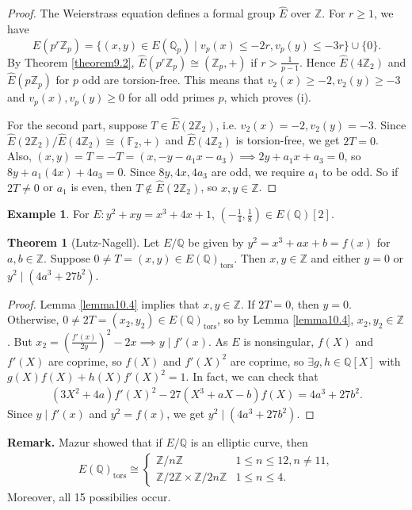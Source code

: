 \documentclass{article}
\theoremstyle{definition}
\newtheorem{theorem}{Theorem}[section]
\newtheorem{example}{Example}[section]
\begin{document}
\begin{proof}
    The Weierstrass equation defines a formal group $\widehat{E}$ over $\mathbb{Z}$. For $r \ge 1$, we have 
    \[
    \widehat{E}(p^r \mathbb{Z}_p) = \{(x,y) \in E(\mathbb{Q}_p) \mid v_p(x)\le -2r, v_p(y)\le -3r\} \cup \{0\}.
    \]
    By Theorem \ref{theorem9.2}, $\widehat{E}(p^r\mathbb{Z}_p) \cong (\mathbb{Z}_p,+)$ if $r>\frac{1}{p-1}$. Hence $\widehat{E}(4\mathbb{Z}_2)$ and $\widehat{E}(p\mathbb{Z}_p)$ for $p$ odd are torsion-free. This means that $v_2(x)\ge -2, v_2(y)\ge -3$ and $v_p(x),v_p(y)\ge 0$ for all odd primes $p$, which proves (i).
    \vspace{1mm}
     
    For the second part, suppose $T \in \widehat{E}(2\mathbb{Z}_2)$, i.e. $v_2(x)=-2,v_2(y)=-3$. Since $\widehat{E}(2\mathbb{Z}_2)/\widehat{E}(4\mathbb{Z}_2)\cong (\mathbb{F}_2,+)$ and $\widehat{E}(4\mathbb{Z}_2)$ is torsion-free, we get $2T=0$. Also, $(x,y) = T = -T = (x,-y-a_1x-a_3) \implies 2y+a_1x+a_3=0$, so $8y+a_1(4x)+4a_3=0$. Since $8y, 4x, 4a_3$ are odd, we require $a_1$ to be odd. So if $2T \neq 0$ or $a_1$ is even, then $T \not\in \widehat{E}(2\mathbb{Z}_2)$, so $x, y \in \mathbb{Z}$.
\end{proof}
\begin{example}
    For $E:y^2+xy=x^3+4x+1$, $\left(-\frac{1}{4},\frac{1}{8}\right) \in E(\mathbb{Q})[2]$.
\end{example}
\begin{theorem}[Lutz-Nagell]
    Let $E/\mathbb{Q}$ be given by $y^2=x^3+ax+b=f(x)$ for $a,b \in \mathbb{Z}$. Suppose $0 \neq T = (x,y) \in E(\mathbb{Q})_{\text{tors}}$. Then $x,y \in \mathbb{Z}$ and either $y=0$ or $y^2 \mid (4a^3+27b^2)$.
\end{theorem}
\begin{proof}
    Lemma \ref{lemma10.4} implies that $x,y \in \mathbb{Z}$. If $2T=0$, then $y=0$. Otherwise, $0 \neq 2T = (x_2,y_2) \in E(\mathbb{Q})_{\text{tors}}$, so by Lemma \ref{lemma10.4}, $x_2,y_2 \in \mathbb{Z}$. But $x_2 = \left(\frac{f'(x)}{2y}\right)^2-2x \implies y \mid f'(x)$. As $E$ is nonsingular, $f(X)$ and $f'(X)$ are coprime, so $f(X)$ and $f'(X)^2$ are coprime, so $\exists g,h \in \mathbb{Q}[X]$ with $g(X)f(X)+h(X)f'(X)^2=1$. In fact, we can check that
    \begin{align*}
        (3X^2+4a)f'(X)^2-27(X^3+aX-b)f(X)=4a^3+27b^2.
    \end{align*}
    Since $y \mid f'(x)$ and $y^2 = f(x)$, we get $y^2 \mid (4a^3+27b^2)$.
\end{proof}
\textbf{Remark.} Mazur showed that if $E/\mathbb{Q}$ is an elliptic curve, then
\begin{align*}
    E(\mathbb{Q})_{\text{tors}} \cong \begin{cases}
        \mathbb{Z}/n\mathbb{Z} & 1\le n\le 12, n \neq 11,\\
        \mathbb{Z}/2\mathbb{Z} \times \mathbb{Z}/2n\mathbb{Z} & 1\le n\le 4.
    \end{cases}
\end{align*}
Moreover, all 15 possibilies occur.
\end{document}
